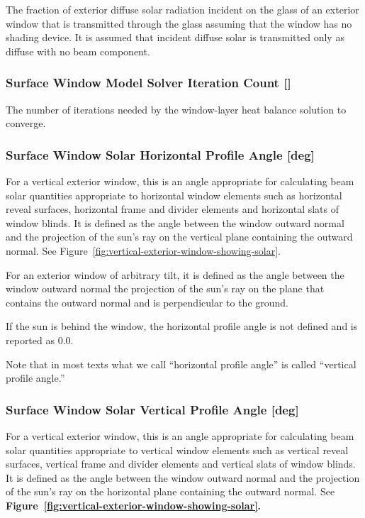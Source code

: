 The fraction of exterior diffuse solar radiation incident on the glass of an exterior window that is transmitted through the glass assuming that the window has no shading device. It is assumed that incident diffuse solar is transmitted only as diffuse with no beam component.

\subsubsection{Surface Window Model Solver Iteration Count {[]}}\label{surface-window-model-solver-iteration-count}

The number of iterations needed by the window-layer heat balance solution to converge.

\subsubsection{Surface Window Solar Horizontal Profile Angle {[}deg{]}}\label{surface-window-solar-horizontal-profile-angle-deg}

For a vertical exterior window, this is an angle appropriate for calculating beam solar quantities appropriate to horizontal window elements such as horizontal reveal surfaces, horizontal frame and divider elements and horizontal slats of window blinds. It is defined as the angle between the window outward normal and the projection of the sun's ray on the vertical plane containing the outward normal. See Figure~\ref{fig:vertical-exterior-window-showing-solar}.

For an exterior window of arbitrary tilt, it is defined as the angle between the window outward normal the projection of the sun's ray on the plane that contains the outward normal and is perpendicular to the ground.

If the sun is behind the window, the horizontal profile angle is not defined and is reported as 0.0.

Note that in most texts what we call ``horizontal profile angle'' is called ``vertical profile angle.''

\subsubsection{Surface Window Solar Vertical Profile Angle {[}deg{]}}\label{surface-window-solar-vertical-profile-angle-deg}

For a vertical exterior window, this is an angle appropriate for calculating beam solar quantities appropriate to vertical window elements such as vertical reveal surfaces, vertical frame and divider elements and vertical slats of window blinds. It is defined as the angle between the window outward normal and the projection of the sun's ray on the horizontal plane containing the outward normal. See \textbf{Figure~\ref{fig:vertical-exterior-window-showing-solar}.}

